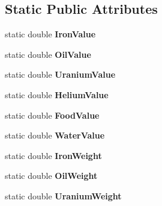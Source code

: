 \subsection*{Static Public Attributes}
\begin{DoxyCompactItemize}
\item 
static double {\bfseries Iron\+Value}\hypertarget{classuniverse_1_1_resource_a950ef55843a4eedef72050ecfc0bd037}{}\label{classuniverse_1_1_resource_a950ef55843a4eedef72050ecfc0bd037}

\item 
static double {\bfseries Oil\+Value}\hypertarget{classuniverse_1_1_resource_aaff463159d8fb910f6840a7f00ce210d}{}\label{classuniverse_1_1_resource_aaff463159d8fb910f6840a7f00ce210d}

\item 
static double {\bfseries Uranium\+Value}\hypertarget{classuniverse_1_1_resource_a2247859c8f184cb7a21b5116bc0eac6c}{}\label{classuniverse_1_1_resource_a2247859c8f184cb7a21b5116bc0eac6c}

\item 
static double {\bfseries Helium\+Value}\hypertarget{classuniverse_1_1_resource_aa03ccc9d0a8fc15a891a5a3af9df9a94}{}\label{classuniverse_1_1_resource_aa03ccc9d0a8fc15a891a5a3af9df9a94}

\item 
static double {\bfseries Food\+Value}\hypertarget{classuniverse_1_1_resource_a9a2f4ca1f94a810da1b8346c6abe5ee3}{}\label{classuniverse_1_1_resource_a9a2f4ca1f94a810da1b8346c6abe5ee3}

\item 
static double {\bfseries Water\+Value}\hypertarget{classuniverse_1_1_resource_aac65305bce15f4e36443daaa8ae724ea}{}\label{classuniverse_1_1_resource_aac65305bce15f4e36443daaa8ae724ea}

\item 
static double {\bfseries Iron\+Weight}\hypertarget{classuniverse_1_1_resource_abd10e0ee8b0272bf54c69f371f6cd216}{}\label{classuniverse_1_1_resource_abd10e0ee8b0272bf54c69f371f6cd216}

\item 
static double {\bfseries Oil\+Weight}\hypertarget{classuniverse_1_1_resource_a9b37653eb124e4f5515f2fef22875ab5}{}\label{classuniverse_1_1_resource_a9b37653eb124e4f5515f2fef22875ab5}

\item 
static double {\bfseries Uranium\+Weight}\hypertarget{classuniverse_1_1_resource_a46cd57df0c960faa730cfc463db1b078}{}\label{classuniverse_1_1_resource_a46cd57df0c960faa730cfc463db1b078}


\end{DoxyCompactItemize}
